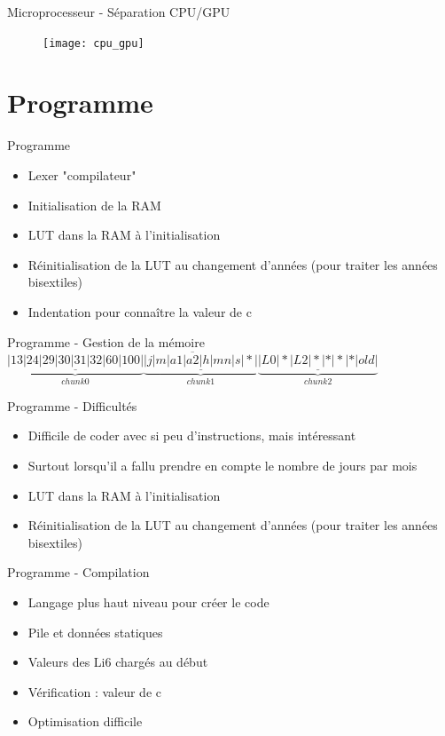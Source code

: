 \documentclass{beamer}
\begin{document}
\begin{frame}{Microprocesseur - Séparation CPU/GPU}
	\begin{figure}
		\centering
		\texttt{[image: cpu\_gpu]}
	\end{figure}
\end{frame}



\section{Programme}
\begin{frame}{Programme}
	\begin{itemize}
		\item Lexer "compilateur"
		\item Initialisation de la RAM
		\item LUT dans la RAM à l'initialisation
		\item Réinitialisation de la LUT au changement d'années (pour traiter les années bisextiles)
		\item Indentation pour connaître la valeur de c
	\end{itemize}
\end{frame}

\begin{frame}{Programme - Gestion de la mémoire}
	$\overline{\underbrace{\underline{|13|24|29|30|31|32|60|100|}}_{chunk 0}\underbrace{\underline{|j|m|a1|a2|h|mn|s|*|}}_{chunk 1}\underbrace{\underline{|L0|*|L2|*|*|*|*|old|}}_{chunk 2}}$
\end{frame}

\begin{frame}{Programme - Difficultés}
	\begin{itemize}
		\item Difficile de coder avec si peu d'instructions, mais intéressant
		\item Surtout lorsqu'il a fallu prendre en compte le nombre de jours par mois
		\item LUT dans la RAM à l'initialisation
		\item Réinitialisation de la LUT au changement d'années (pour traiter les années bisextiles)
	\end{itemize}
\end{frame}

\begin{frame}{Programme - Compilation}
	\begin{itemize}
		\item Langage plus haut niveau pour créer le code
		\item Pile et données statiques
		\item Valeurs des Li6 chargés au début
		\item Vérification : valeur de c
		\item Optimisation difficile
	\end{itemize}
\end{frame}
\end{document}
